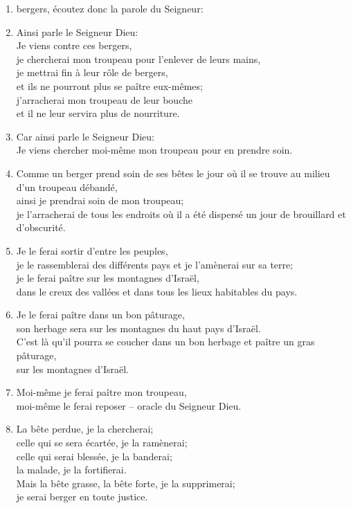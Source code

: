 \begin{enumerate}[leftmargin=\psleftmargin, labelsep = \pslabelsep, label={\arabic*}, font=\color{\pscolor}\small\textsuperscript, parsep=0em, itemsep=0em, topsep=0em ]
    \item bergers, écoutez donc la parole du Seigneur:
    \item Ainsi parle le Seigneur Dieu: \\ Je viens contre ces bergers, \\ je chercherai mon troupeau pour l’enlever de leurs mains, \\ je mettrai fin à leur rôle de bergers, \\
          et ils ne pourront plus se paître eux-mêmes; \\ j’arracherai mon troupeau de leur bouche \\
          et il ne leur servira plus de nourriture. \parSpace
    \item Car ainsi parle le Seigneur Dieu: \\ Je viens chercher moi-même mon troupeau pour en prendre soin.
    \item Comme un berger prend soin de ses bêtes le jour où il se trouve au milieu d’un troupeau débandé, \\ ainsi je prendrai soin de mon troupeau; \\ je l’arracherai de tous les endroits où il a été dispersé un jour de brouillard et d’obscurité.
    \item Je le ferai sortir d’entre les peuples, \\ je le rassemblerai des différents pays et je l’amènerai sur sa terre; \\ je le ferai paître sur les montagnes d’Israël, \\ dans le creux des vallées et dans tous les lieux habitables du pays.
    \item Je le ferai paître dans un bon pâturage, \\ son herbage sera sur les montagnes du haut pays d’Israël.\\ C’est là qu’il pourra se coucher dans un bon herbage et paître un gras pâturage, \\ sur les montagnes d’Israël.
    \item Moi-même je ferai paître mon troupeau,\\  moi-même le ferai reposer – oracle du Seigneur Dieu.
    \item La bête perdue, je la chercherai; \\ celle qui se sera écartée, je la ramènerai; \\ celle qui serai blessée, je la banderai; \\ la malade, je la fortifierai. \\
    Mais la bête grasse, la bête forte, je la supprimerai; \\ je serai berger en toute justice.\parSpace

\end{enumerate}
